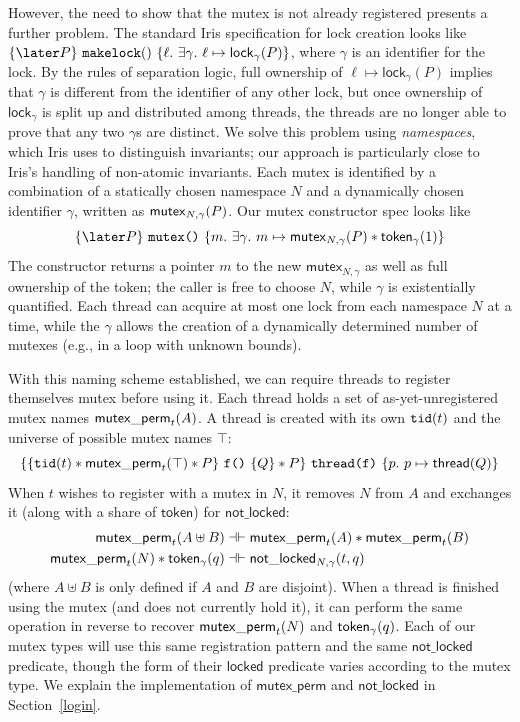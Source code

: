 However, the need to show that the mutex is not already registered presents a further problem. The standard Iris specification for lock creation looks like $\{ \later P \}\ \texttt{makelock}()\ \{ \ell.\ \exists \gamma.\ \ell \mapsto \mathsf{lock}_\gamma(P) \}$, where $\gamma$ is an identifier for the lock. By the rules of separation logic, full ownership of $\ell \mapsto \mathsf{lock}_\gamma(P)$ implies that $\gamma$ is different from the identifier of any other lock, but once ownership of $\mathsf{lock}_\gamma$ is split up and distributed among threads, the threads are no longer able to prove that any two $\gamma$s are distinct. We solve this problem using \emph{namespaces}, which Iris uses to distinguish invariants; our approach is particularly close to Iris's handling of non-atomic invariants. Each mutex is identified by a combination of a statically chosen namespace $N$ and a dynamically chosen identifier $\gamma$, written as $\mathsf{mutex}_{N, \gamma}(P)$. Our mutex constructor spec looks like \[\{\later P\}\ \texttt{mutex()}\ \{m.\ \exists \gamma.\ m \mapsto \mutex{N, \gamma}{P} \ast \token{\gamma}{1}\}\]
The constructor returns a pointer $m$ to the new $\mathsf{mutex}_{N, \gamma}$ as well as full ownership of the token; the caller is free to choose $N$, while $\gamma$ is existentially quantified. Each thread can acquire at most one lock from each namespace $N$ at a time, while the $\gamma$ allows the creation of a dynamically determined number of mutexes (e.g., in a loop with unknown bounds).

With this naming scheme established, we can require threads to register themselves mutex before using it. Each thread holds a set of as-yet-unregistered mutex names $\mathsf{mutex\_perm}_{t}(A)$. A thread is created with its own $\mathtt{tid}(t)$ and the universe of possible mutex names $\top$:
\[ \{ \{\currentthread{t} \ast \mutexperm{t}{\top} \ast P\}\ \texttt{f()}\ \{Q\} \ast P\}\ \texttt{thread(f)}\ \{ p.\ p \mapsto \mathsf{thread}(Q) \}
\]
When $t$ wishes to register with a mutex in $N$, it removes $N$ from $A$ and exchanges it (along with a share of $\mathsf{token}$) for $\mathsf{not\_locked}$:
\begin{align*}
  \mathsf{mutex\_perm}_{t}(A \uplus B) & \dashv\vdash \mathsf{mutex\_perm}_{t}(A) \ast \mathsf{mutex\_perm}_{t}(B) \\
  \mathsf{mutex\_perm}_{t}(N) \ast \mathsf{token}_{\gamma}(q) & \dashv \vdash \mathsf{not\_locked}_{N, \gamma}(t, q)
\end{align*}
(where $A \uplus B$ is only defined if $A$ and $B$ are disjoint).
When a thread is finished using the mutex (and does not currently hold it), it can perform the same operation in reverse to recover $\mathsf{mutex\_perm}_{t}(N)$ and $\mathsf{token}_{\gamma}(q)$.
Each of our mutex types will use this same registration pattern and the same $\mathsf{not\_locked}$ predicate, though the form of their $\mathsf{locked}$ predicate varies according to the mutex type. We explain the implementation of $\mathsf{mutex\_perm}$ and $\mathsf{not\_locked}$ in Section~\ref{login}.

